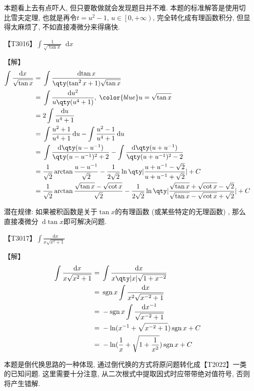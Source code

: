 \documentclass{ctexbook}
\DeclareMathOperator{\sgn}{sgn}
\newcommand*{\dif}{\mathop{}\!\mathrm{d}}
\begin{document}
{{\kaishu 本题看上去有点吓人, 但只要敢做就会发现题目并不难. 本题的标准解答是使用切比雪夫定理, 也就是再令$t=u^{2}-1,\,u\in\left[0,+\infty\right)$, 完全转化成有理函数积分, 但显得太麻烦了, 不如直接凑微分来得痛快. \par}
{\color{red}【T3016】}$\int\frac{1}{\sqrt{\tan{x}}}\dif{x}$\par
【解】
\begin{align*}
\int\frac{\dif{x}}{\sqrt{\tan{x}}}={}&\int\frac{\dif{\tan{x}}}{\qty(\tan^{2}{x}+1)\sqrt{\tan{x}}}\\
={}&\int\frac{\dif{u^{2}}}{u\qty(u^{4}+1)},\;{\color{blue}u=\sqrt{\tan{x}}}\\
={}&2\int\frac{\dif{u}}{u^{4}+1}\\
={}&\int\frac{u^{2}+1}{u^{4}+1}\dif{u}-\int\frac{u^{2}-1}{u^{4}+1}\dif{u}\\
={}&\int\frac{\dif{\qty(u-u^{-1})}}{\qty(u-u^{-1})^{2}+2}-\int\frac{\dif{\qty(u+u^{-1})}}{\qty(u+u^{-1})^{2}-2}\\
={}&\frac{1}{\sqrt{2}}\arctan{\frac{u-u^{-1}}{\sqrt{2}}}-\frac{1}{2\sqrt{2}}\ln\qty|\frac{u+u^{-1}-\sqrt{2}}{u+u^{-1}+\sqrt{2}}|+C\\
={}&\frac{1}{\sqrt{2}}\arctan{\frac{\sqrt{\tan{x}}-\sqrt{\cot{x}}}{\sqrt{2}}}-\frac{1}{2\sqrt{2}}\ln\qty|\frac{\sqrt{\tan{x}}+\sqrt{\cot{x}}-\sqrt{2}}{\sqrt{\tan{x}}-\sqrt{\cot{x}}+\sqrt{2}}|+C
\end{align*}\par
{\kaishu 潜在规律: 如果被积函数是关于$\tan{x}$的有理函数 (或某些特定的无理函数) , 那么直接凑微分$\dif{\tan{x}}$即可解决问题. \par}
{\color{red}【T3017】}$\int\frac{\dif{x}}{x\sqrt{x^{2}+1}}$\par
【解】
\begin{align*}
\int\frac{\dif{x}}{x\sqrt{x^{2}+1}}={}&\int\frac{\dif{x}}{x\qty|x|\sqrt{1+x^{-2}}}\\
={}&\sgn{x}\int\frac{\dif{x}}{x^{2}\sqrt{x^{-2}+1}}\\
={}&-\sgn{x}\int\frac{\dif{x^{-1}}}{\sqrt{x^{-2}+1}}\\
={}&-\ln(x^{-1}+\sqrt{x^{-2}+1})\sgn{x}+C\\
={}&-\ln(\frac{1}{x}+\sqrt{1+\frac{1}{x^{2}}})\sgn{x}+C
\end{align*}\par
{\kaishu 本题是倒代换思路的一种体现, 通过倒代换的方式将原问题转化成{\color{red}【T2022】}一类的已知问题. 这里需要十分注意, 从二次根式中提取因式时应带带绝对值符号, 否则将产生错解. \par
}}
\end{document}
